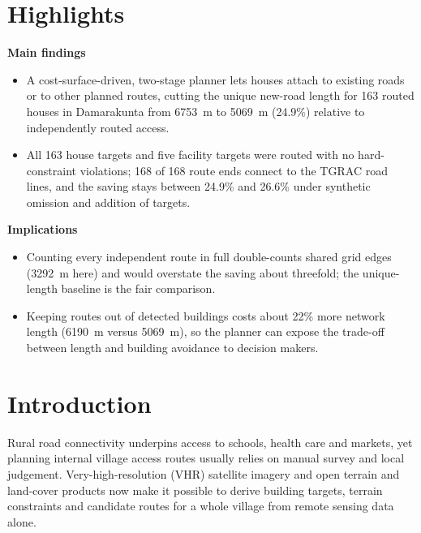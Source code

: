 \providecommand{\needs}[1]{{\color{red}[#1]}}

\section*{Highlights}
\textbf{Main findings}
\begin{itemize}
\item A cost-surface-driven, two-stage planner lets houses attach to existing roads or to other planned routes, cutting the unique new-road length for 163 routed houses in Damarakunta from 6753~m to 5069~m (24.9\%) relative to independently routed access.
\item All 163 house targets and five facility targets were routed with no hard-constraint violations; 168 of 168 route ends connect to the TGRAC road lines, and the saving stays between 24.9\% and 26.6\% under synthetic omission and addition of targets.
\end{itemize}
\textbf{Implications}
\begin{itemize}
\item Counting every independent route in full double-counts shared grid edges (3292~m here) and would overstate the saving about threefold; the unique-length baseline is the fair comparison.
\item Keeping routes out of detected buildings costs about 22\% more network length (6190~m versus 5069~m), so the planner can expose the trade-off between length and building avoidance to decision makers.
\end{itemize}

\section{Introduction}
Rural road connectivity underpins access to schools, health care and markets, yet planning internal village access routes usually relies on manual survey and local judgement. Very-high-resolution (VHR) satellite imagery and open terrain and land-cover products now make it possible to derive building targets, terrain constraints and candidate routes for a whole village from remote sensing data alone.

